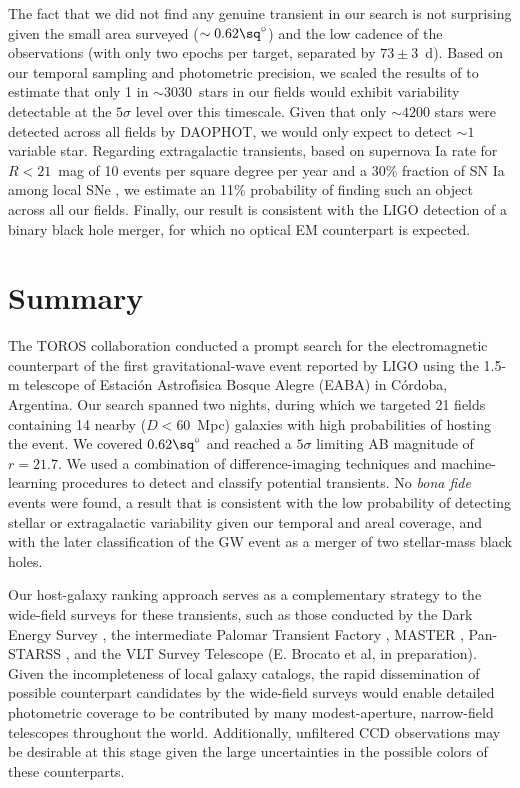 \documentclass[apjl]{emulateapj}
\begin{document}
The fact that we did not find any genuine transient in our search is not surprising given the small area surveyed ($\sim0.62 \sq^{\circ}$) and the low cadence of the observations (with only two epochs per target, separated by $73\pm3$~d). Based on our temporal sampling and photometric precision, we scaled the results of \citet{Oelkers2015, Oelkers2016} to estimate that only 1 in $\sim3030$~stars in our fields would exhibit variability detectable at the $5\sigma$ level over this timescale. Given that only $\sim4200$ stars were detected across all fields by DAOPHOT, we would only expect to detect $\sim 1$ variable star. Regarding extragalactic transients, based on supernova Ia rate for $R<21$~mag of 10 events per square degree per year \citep{Pain1996,Garnavich2004} and a 30\% fraction of SN Ia among local SNe \citep{Guillochon2016}, we estimate an 11\% probability of finding such an object across all our fields. Finally, our result is consistent with the LIGO detection of a binary black hole merger, for which no optical EM counterpart is expected.

\section{Summary}\label{conclusions}

The TOROS collaboration conducted a prompt search for the electromagnetic counterpart of the first gravitational-wave event reported by LIGO using the 1.5-m telescope of Estaci\'on Astrof\'{\i}sica Bosque Alegre (EABA) in C\'ordoba, Argentina. Our search spanned two nights, during which we targeted 21 fields containing 14 nearby ($D<60$~Mpc) galaxies with high probabilities of hosting the event. We covered $0.62\sq^{\circ}$ and reached a $5\sigma$ limiting AB magnitude of $r=21.7$. We used a combination of difference-imaging techniques and machine-learning procedures to detect and classify potential transients. No {\it bona fide} events were found, a result that is consistent with the low probability of detecting stellar or extragalactic variability given our temporal and areal coverage, and with the later classification of the GW event as a merger of two stellar-mass black holes.

Our host-galaxy ranking approach serves as a complementary strategy to the wide-field surveys for these transients, such as those conducted by the Dark Energy Survey \citep{Annis2016,Soares2016}, the intermediate Palomar Transient Factory \citep{Kasliwal2016},  MASTER \citep{2016arXiv160501607L}, Pan-STARSS \citep{2016arXiv160204156S}, and the VLT Survey Telescope (E. Brocato et al, in preparation). Given the incompleteness of local galaxy catalogs, the rapid dissemination of possible counterpart candidates by the wide-field surveys would enable detailed photometric coverage to be contributed by many modest-aperture, narrow-field telescopes throughout the world. Additionally, unfiltered CCD observations may be desirable at this stage given the large uncertainties in the possible colors of these counterparts.
\end{document}

